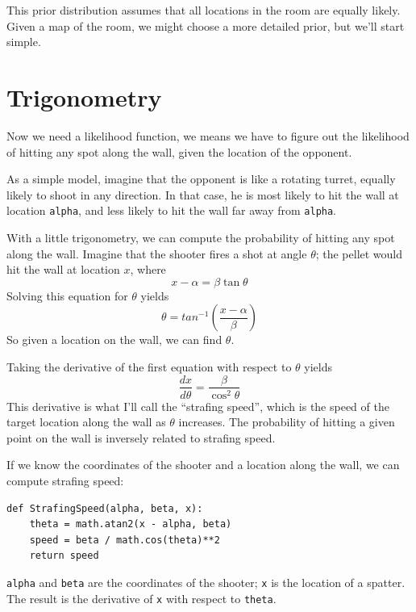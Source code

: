 \documentclass[12pt]{book}
\begin{document}
This prior distribution assumes that all locations in the room are
equally likely.  Given a map of the room, we might choose a more
detailed prior, but we'll start simple.


\section{Trigonometry}

Now we need a likelihood function, we means we have to figure
out the likelihood of hitting any spot along the wall, given
the location of the opponent.

As a simple model, imagine that the opponent is like a rotating
turret, equally likely to shoot in any direction.
In that case, he is most likely to hit
the wall at location {\tt alpha}, and less likely to hit the wall far
away from {\tt alpha}.

With a little trigonometry, we can compute the probability of hitting
any spot along the wall.  Imagine that the shooter fires a shot at
angle $\theta$; the pellet would hit the wall at location $x$, where
%
\[ x - \alpha = \beta \tan \theta \]
%
Solving this equation for $\theta$ yields
%
\[ \theta = tan^{-1} \left( \frac{x - \alpha}{\beta} \right) \]
%
So given a location on the wall, we can find $\theta$.

Taking the derivative of the first equation with respect to
$\theta$ yields
%
\[ \frac{dx}{d\theta} = \frac{\beta}{\cos^2 \theta} \]
%
This derivative is what I'll call the ``strafing speed'',
which is the speed of the target location along the wall as $\theta$
increases.  The probability of hitting a given point on the wall is
inversely related to strafing speed.

If we know the coordinates of the shooter and a location 
along the wall, we can compute strafing speed:

\begin{verbatim}
def StrafingSpeed(alpha, beta, x):
    theta = math.atan2(x - alpha, beta)
    speed = beta / math.cos(theta)**2
    return speed
\end{verbatim}

{\tt alpha} and {\tt beta} are the coordinates of the shooter;
{\tt x} is the location of a spatter.  The result is
the derivative of {\tt x} with respect to {\tt theta}.
\end{document}
